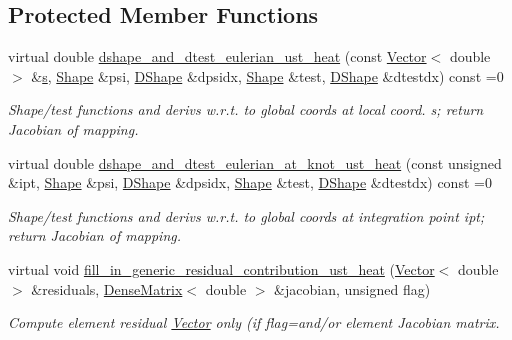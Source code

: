 \subsection*{Protected Member Functions}
\begin{DoxyCompactItemize}
\item 
virtual double \hyperlink{classoomph_1_1UnsteadyHeatEquations_a70c72c1d6e716657d819264f1131b77c}{dshape\+\_\+and\+\_\+dtest\+\_\+eulerian\+\_\+ust\+\_\+heat} (const \hyperlink{classoomph_1_1Vector}{Vector}$<$ double $>$ \&\hyperlink{cfortran_8h_ab7123126e4885ef647dd9c6e3807a21c}{s}, \hyperlink{classoomph_1_1Shape}{Shape} \&psi, \hyperlink{classoomph_1_1DShape}{D\+Shape} \&dpsidx, \hyperlink{classoomph_1_1Shape}{Shape} \&test, \hyperlink{classoomph_1_1DShape}{D\+Shape} \&dtestdx) const =0
\begin{DoxyCompactList}\small\item\em Shape/test functions and derivs w.\+r.\+t. to global coords at local coord. s; return Jacobian of mapping. \end{DoxyCompactList}\item 
virtual double \hyperlink{classoomph_1_1UnsteadyHeatEquations_aa6ab5a2e2bbf3830dfb17f8f2d1281b0}{dshape\+\_\+and\+\_\+dtest\+\_\+eulerian\+\_\+at\+\_\+knot\+\_\+ust\+\_\+heat} (const unsigned \&ipt, \hyperlink{classoomph_1_1Shape}{Shape} \&psi, \hyperlink{classoomph_1_1DShape}{D\+Shape} \&dpsidx, \hyperlink{classoomph_1_1Shape}{Shape} \&test, \hyperlink{classoomph_1_1DShape}{D\+Shape} \&dtestdx) const =0
\begin{DoxyCompactList}\small\item\em Shape/test functions and derivs w.\+r.\+t. to global coords at integration point ipt; return Jacobian of mapping. \end{DoxyCompactList}\item 
virtual void \hyperlink{classoomph_1_1UnsteadyHeatEquations_acde24104d5adcabe8a76a3a52c17ab5f}{fill\+\_\+in\+\_\+generic\+\_\+residual\+\_\+contribution\+\_\+ust\+\_\+heat} (\hyperlink{classoomph_1_1Vector}{Vector}$<$ double $>$ \&residuals, \hyperlink{classoomph_1_1DenseMatrix}{Dense\+Matrix}$<$ double $>$ \&jacobian, unsigned flag)
\begin{DoxyCompactList}\small\item\em Compute element residual \hyperlink{classoomph_1_1Vector}{Vector} only (if flag=and/or element Jacobian matrix. \end{DoxyCompactList}\end{DoxyCompactItemize}
